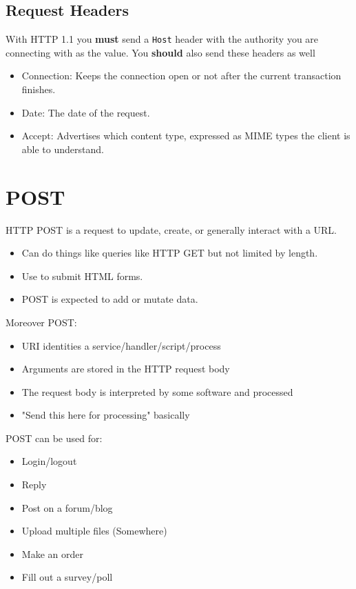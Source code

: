 \documentclass[../CMPUT-404-Notes.tex]{subfiles}
\begin{document}
\subsection{Request Headers}
With HTTP 1.1 you \textbf{must} send a \texttt{Host} header with the authority you are connecting with as the value.
You \textbf{should} also send these headers as well
\begin{itemize}
  \item Connection: Keeps the connection open or not after the current transaction finishes.
  \item Date: The date of the request.
  \item Accept: Advertises which content type, expressed as MIME types the client is able to understand.
\end{itemize}


\section{POST}
HTTP POST is a request to update, create, or generally interact with a URL. 
\begin{itemize}
  \item Can do things like queries like HTTP GET but not limited by length.
  \item Use to submit HTML forms.
  \item POST is expected to add or mutate data.
\end{itemize}

Moreover POST:
\begin{itemize}
  \item URI identities a service/handler/script/process
  \item Arguments are stored in the HTTP request body
  \item The request body is interpreted by some software and processed
  \item "Send this here for processing" basically
\end{itemize}

POST can be used for:
\begin{itemize}
  \item Login/logout
  \item Reply
  \item Post on a forum/blog
  \item Upload multiple files (Somewhere)
  \item Make an order
  \item Fill out a survey/poll
\end{itemize}
\end{document}
